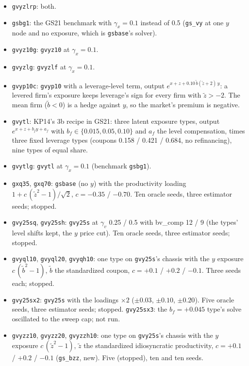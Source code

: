 \begin{itemize}
\item \texttt{gvyzlrp}: both.
\item \texttt{gsbg1}: the GS21 benchmark with $\gamma_x=0.1$ instead of 0.5 (\texttt{gs\_vy} at one $y$ node and no exposure, which is \texttt{gsbase}'s solver).
\item \texttt{gvyz10g}: \texttt{gvyz10} at $\gamma_x=0.1$.
\item \texttt{gvyzlg}: \texttt{gvyzlf} at $\gamma_x=0.1$.
\item \texttt{gvyp10c}: \texttt{gvyp10} with a leverage-level term, output $e^{x+z+0.10\,\tilde b(\tilde z+2)\,y}$: a levered firm's exposure keeps leverage's sign for every firm with $\tilde z>-2$. The mean firm ($\tilde b<0$) is a hedge against $y$, so the market's premium is negative.
\item \texttt{gvytl}: KP14's 3b recipe in GS21: three latent exposure types, output $e^{x+z+b_f y+a_f}$ with $b_f\in\{0.015,0.05,0.10\}$ and $a_f$ the level compensation, times three fixed leverage types (coupons 0.158 / 0.421 / 0.684, no refinancing), nine types of equal share.
\item \texttt{gvytlg}: \texttt{gvytl} at $\gamma_x=0.1$ (benchmark \texttt{gsbg1}).
\item \texttt{gxq35}, \texttt{gxq70}: \texttt{gsbase} (no $y$) with the productivity loading $1 + c\,(\tilde z^2-1)/\sqrt2$, $c=-0.35$ / $-0.70$. Ten oracle seeds, three estimator seeds; stopped.
\item \texttt{gvy25sq}, \texttt{gvy25sh}: \texttt{gvy25s} at $\gamma_v$ 0.25 / 0.5 with bv\_comp 12 / 9 (the types' level shifts kept, the $y$ price cut). Ten oracle seeds, three estimator seeds; stopped.
\item \texttt{gvyql10}, \texttt{gvyql20}, \texttt{gvyqh10}: one type on \texttt{gvy25s}'s chassis with the $y$ exposure $c\,(\tilde b^2-1)$, $\tilde b$ the standardized coupon, $c=+0.1$ / $+0.2$ / $-0.1$. Three seeds each; stopped.
\item \texttt{gvy25sx2}: \texttt{gvy25s} with the loadings $\times2$ ($\pm0.03$, $\pm0.10$, $\pm0.20$). Five oracle seeds, three estimator seeds; stopped. \texttt{gvy25sx3}: the $b_f=+0.045$ type's solve oscillated to the sweep cap; not run.
\item \texttt{gvyzz10}, \texttt{gvyzz20}, \texttt{gvyzzh10}: one type on \texttt{gvy25s}'s chassis with the $y$ exposure $c\,(\tilde z^2-1)$, $\tilde z$ the standardized idiosyncratic productivity, $c=+0.1$ / $+0.2$ / $-0.1$ (\texttt{gs\_bzz}, new). Five (stopped), ten and ten seeds.

\end{itemize}
